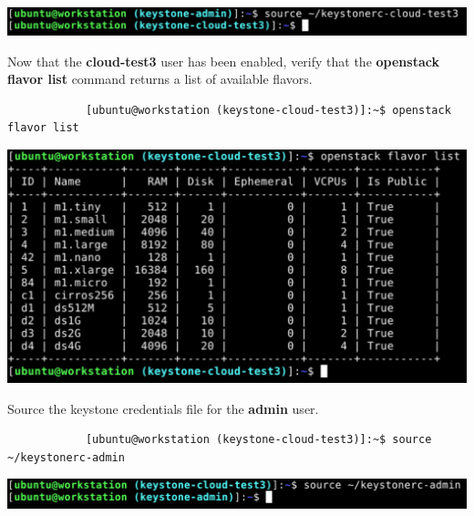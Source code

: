 \documentclass[letterpaper, 12pt]{article}
\begin{document}
\begin{enumerate}
\begin{labstep}
        \begin{center}
            \includegraphics[width=\linewidth]{images/part4/step18.png}
        \end{center}
    \end{labstep}

    \begin{labstep}
        Now that the \textbf{cloud-test3} user has been enabled, verify that the \textbf{openstack flavor list} command returns a list of available flavors.
        \begin{lstlisting}
            [ubuntu@workstation (keystone-cloud-test3)]:~$ openstack flavor list
        \end{lstlisting}

        \begin{center}
            \includegraphics[width=\linewidth]{images/part4/step19.png}
        \end{center}
    \end{labstep}

    \begin{labstep}
        Source the keystone credentials file for the \textbf{admin} user.
        \begin{lstlisting}
            [ubuntu@workstation (keystone-cloud-test3)]:~$ source ~/keystonerc-admin
        \end{lstlisting}

        \begin{center}
            \includegraphics[width=\linewidth]{images/part4/step20.png}
        \end{center}
    \end{labstep}


\end{enumerate}
\end{document}
